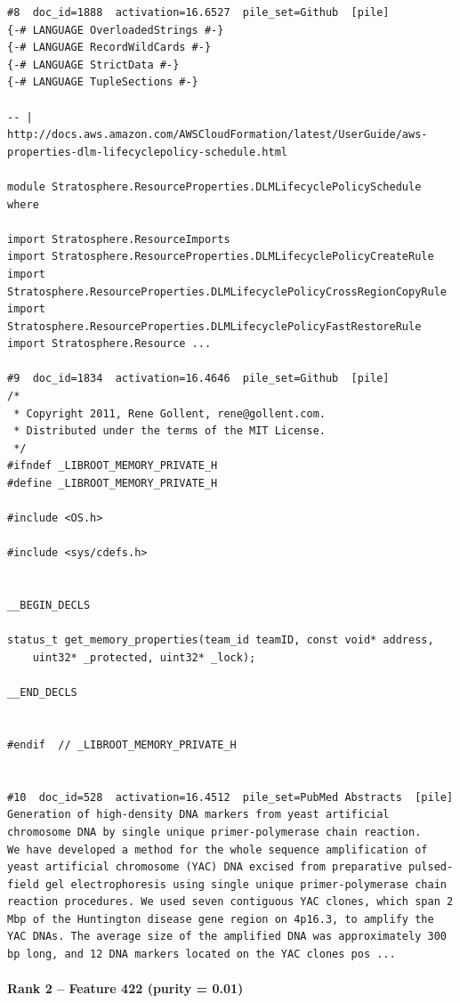 \begin{verbatim}
#8  doc_id=1888  activation=16.6527  pile_set=Github  [pile]
{-# LANGUAGE OverloadedStrings #-}
{-# LANGUAGE RecordWildCards #-}
{-# LANGUAGE StrictData #-}
{-# LANGUAGE TupleSections #-}

-- | http://docs.aws.amazon.com/AWSCloudFormation/latest/UserGuide/aws-properties-dlm-lifecyclepolicy-schedule.html

module Stratosphere.ResourceProperties.DLMLifecyclePolicySchedule where

import Stratosphere.ResourceImports
import Stratosphere.ResourceProperties.DLMLifecyclePolicyCreateRule
import Stratosphere.ResourceProperties.DLMLifecyclePolicyCrossRegionCopyRule
import Stratosphere.ResourceProperties.DLMLifecyclePolicyFastRestoreRule
import Stratosphere.Resource ...

#9  doc_id=1834  activation=16.4646  pile_set=Github  [pile]
/*
 * Copyright 2011, Rene Gollent, rene@gollent.com.
 * Distributed under the terms of the MIT License.
 */
#ifndef _LIBROOT_MEMORY_PRIVATE_H
#define _LIBROOT_MEMORY_PRIVATE_H

#include <OS.h>

#include <sys/cdefs.h>


__BEGIN_DECLS

status_t get_memory_properties(team_id teamID, const void* address,
	uint32* _protected, uint32* _lock);

__END_DECLS


#endif	// _LIBROOT_MEMORY_PRIVATE_H


#10  doc_id=528  activation=16.4512  pile_set=PubMed Abstracts  [pile]
Generation of high-density DNA markers from yeast artificial chromosome DNA by single unique primer-polymerase chain reaction.
We have developed a method for the whole sequence amplification of yeast artificial chromosome (YAC) DNA excised from preparative pulsed-field gel electrophoresis using single unique primer-polymerase chain reaction procedures. We used seven contiguous YAC clones, which span 2 Mbp of the Huntington disease gene region on 4p16.3, to amplify the YAC DNAs. The average size of the amplified DNA was approximately 300 bp long, and 12 DNA markers located on the YAC clones pos ...

\end{verbatim}

\paragraph*{Rank 2 -- Feature 422 (purity = 0.01)}

